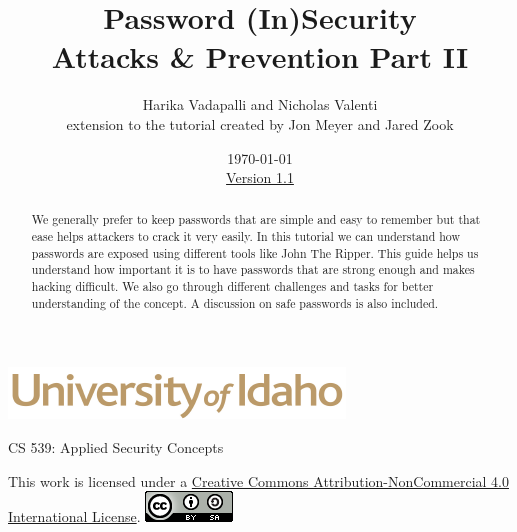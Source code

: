 \documentclass[12pt]{article}
\begin{document}
\title{ Password (In)Security \\ \large Attacks \& Prevention Part II}
\author{Harika Vadapalli and Nicholas Valenti \\ extension to the tutorial created by Jon Meyer and Jared Zook}
\date{\today \\ \hyperref[changelog]{Version 1.1} }
\renewcommand{\abstractname}{Summary}
\begin{titlepage}
\maketitle
{}
\begin{center}
\includegraphics[scale=.5]{UofI}

\large{CS 539: Applied Security Concepts}

\vskip 40pt

\end{center}

\begin{abstract}
We generally prefer to keep passwords that are simple and easy to remember but that ease helps attackers to crack it very easily. In this tutorial we can understand how passwords are exposed using different tools like John The Ripper. This guide helps us understand how important it is to have passwords that are strong enough and makes hacking difficult. We also go through different challenges and tasks for better understanding of the concept. A discussion on safe passwords is also included.  

\end{abstract}


\vfill
\begin{center}
This work is licensed under a \href{https://creativecommons.org/licenses/by-nc-nd/2.0/}{Creative Commons Attribution-NonCommercial 4.0 International License}.
\vskip 10pt
\includegraphics[scale=.5]{cc}
\end{center}

\end{titlepage}

\end{document}
